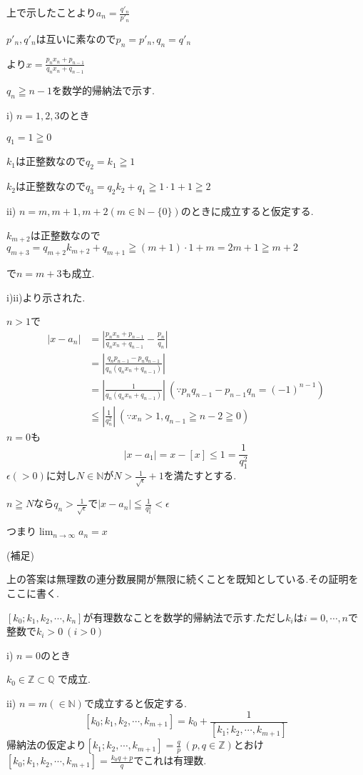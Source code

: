 \documentclass{jsarticle}
\begin{document}
上で示したことより$a_n=\frac{q'_n}{p'_n}$

$p'_n,q'_n$は互いに素なので$p_n=p'_n,q_n=q'_n$

より$x=\frac{p_nx_n+p_{n-1}}{q_nx_n+q_{n-1}}$

$q_n \geqq n-1$を数学的帰納法で示す.

i) $n=1,2,3$のとき

$q_1=1\geqq 0$

$k_1$は正整数なので$q_2=k_1\geqq 1$

$k_2$は正整数なので$q_3=q_2k_2+q_1\geqq 1\cdot 1 + 1 \geqq 2$

ii) $n=m,m+1,m+2 (m\in \mathbb{N}-\{0\})$のときに成立すると仮定する.

$k_{m+2}$は正整数なので$q_{m+3}=q_{m+2}k_{m+2}+q_{m+1} \geqq (m+1)\cdot 1 +m = 2m+1 \geqq m+2 $

で$n=m+3$も成立.

i)ii)より示された.

$n > 1$で
\begin{align*}
|x-a_n| &= |\frac{p_nx_n+p_{n-1}}{q_nx_n+q_{n-1}}-\frac{p_n}{q_n}|\\
&=|\frac{q_np_{n-1}-p_nq_{n-1}}{q_n(q_nx_n+q_{n-1})}|\\
&= |\frac{1}{q_n(q_nx_n+q_{n-1})}| \ (\because p_nq_{n-1}-p_{n-1}q_n=(-1)^{n-1})\\
&\leqq |\frac{1}{q_n^2}| \ (\because x_n >1 ,q_{n-1}\geqq n-2\geqq 0) 
\end{align*}
$n=0$も
\[|x-a_1|=x-[x]\leq 1=\frac{1}{q_1^2}\]
$\epsilon(>0)$に対し$N\in\mathbb{N}$が$N>\frac{1}{\sqrt{\epsilon}}+1$を満たすとする.

$n\geqq N$なら$q_n > \frac{1}{\sqrt{\epsilon}}$で$|x-a_n|\leqq \frac{1}{q_1^2}<\epsilon$

つまり$\displaystyle\lim_{n\to \infty}a_n=x$

(補足)

上の答案は無理数の連分数展開が無限に続くことを既知としている.その証明をここに書く.

$[k_0;k_1,k_2,\cdots,k_n]$が有理数なことを数学的帰納法で示す.ただし$k_i$は$i=0,\cdots, n$で整数で$k_i>0 \ (i>0)$

i) $n=0$のとき

$k_0\in\mathbb{Z}\subset \mathbb{Q}$
で成立.

ii) $n=m(\in\mathbb{N})$で成立すると仮定する.
\[[k_0;k_1,k_2,\cdots ,k_{m+1}]=k_0+\frac{1}{[k_1;k_2,\cdots ,k_{m+1}]}\]
帰納法の仮定より$[k_1;k_2,\cdots ,k_{m+1}]=\frac{q}{p} \ (p,q\in\mathbb{Z})$とおけ$[k_0;k_1,k_2,\cdots ,k_{m+1}]=\frac{k_0q+p}{q}$でこれは有理数.
\end{document}
